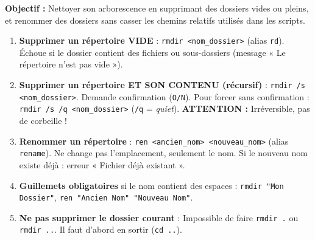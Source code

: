 \documentclass[11pt]{article}
\begin{document}
\begin{methode}
\textbf{Objectif :} Nettoyer son arborescence en supprimant des dossiers vides ou pleins, et renommer des dossiers sans casser les chemins relatifs utilisés dans les scripts.

\begin{enumerate}
    \item \textbf{Supprimer un répertoire \textbf{VIDE}} : \texttt{rmdir <nom\_dossier>} (alias \texttt{rd}). Échoue si le dossier contient des fichiers ou sous-dossiers (message « Le répertoire n'est pas vide »).
    \item \textbf{Supprimer un répertoire \textbf{ET SON CONTENU} (récursif)} : \texttt{rmdir /s <nom\_dossier>}. Demande confirmation (\texttt{O/N}). Pour forcer sans confirmation : \texttt{rmdir /s /q <nom\_dossier>} (\texttt{/q} = \textit{quiet}). \textbf{ATTENTION :} Irréversible, pas de corbeille !
    \item \textbf{Renommer un répertoire} : \texttt{ren <ancien\_nom> <nouveau\_nom>} (alias \texttt{rename}). Ne change pas l'emplacement, seulement le nom. Si le nouveau nom existe déjà : erreur « Fichier déjà existant ».
    \item \textbf{Guillemets obligatoires} si le nom contient des espaces : \texttt{rmdir "Mon Dossier"}, \texttt{ren "Ancien Nom" "Nouveau Nom"}.
    \item \textbf{Ne pas supprimer le dossier courant} : Impossible de faire \texttt{rmdir .} ou \texttt{rmdir ..}. Il faut d'abord en sortir (\texttt{cd ..}).
\end{enumerate}
\end{methode}
\end{document}
